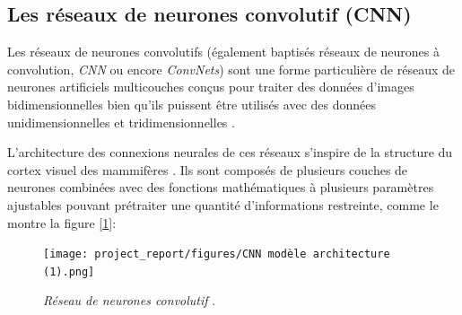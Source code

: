 \subsection{Les réseaux de neurones convolutif (CNN)}
Les réseaux de neurones convolutifs (également baptisés réseaux de neurones à convolution,\textit{ CNN }ou encore \textit{ConvNets}) sont une forme particulière de réseaux de neurones artificiels multicouches conçus pour traiter des données d’images bidimensionnelles bien qu’ils puissent être utilisés avec des données unidimensionnelles et tridimensionnelles \cite{lopez2020convolutional}. \par
L’architecture des connexions neurales de ces réseaux s’inspire de la structure du cortex visuel des mammifères \cite{lopez2020convolutional}. Ils sont composés de plusieurs couches de neurones combinées avec des fonctions mathématiques à plusieurs paramètres ajustables pouvant prétraiter une quantité d’informations restreinte, comme le montre la figure [\ref{fig:figure14}]:

\begin{figure}[h]
    \centering
    \texttt{[image: project\_report/figures/CNN modèle architecture (1).png]} 
    \caption{\textit{Réseau de neurones convolutif} \cite{choudhry2024}.}
        \label{fig:figure14}
 
\end{figure}

